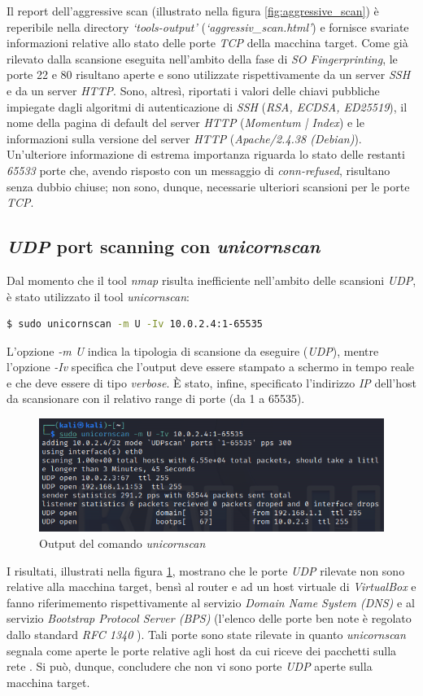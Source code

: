 Il report dell'aggressive scan (illustrato nella figura \ref{fig:aggressive_scan}) è reperibile nella directory \emph{`tools-output'}  (\emph{`aggressiv\_scan.html'}) e fornisce svariate informazioni relative allo stato delle porte \emph{TCP} della macchina target. Come già rilevato dalla scansione eseguita nell'ambito della fase di \emph{SO Fingerprinting}, le porte 22 e 80 risultano aperte e sono utilizzate rispettivamente da un server \emph{SSH} e da un server \emph{HTTP}. Sono, altresì, riportati i valori delle chiavi pubbliche impiegate dagli algoritmi di autenticazione di \emph{SSH} (\emph{RSA, ECDSA, ED25519}), il nome della pagina di default del server \emph{HTTP} (\emph{Momentum | Index}) e le informazioni sulla versione del server \emph{HTTP} (\emph{Apache/2.4.38 (Debian)}). Un'ulteriore informazione di estrema importanza riguarda lo stato delle restanti \emph{65533} porte che, avendo risposto con un messaggio di \emph{conn-refused}, risultano senza dubbio chiuse; non sono, dunque, necessarie ulteriori scansioni per le porte \emph{TCP}. 
\subsection{\emph{UDP} port scanning con \emph{unicornscan}}
Dal momento che il tool \emph{nmap} risulta inefficiente nell'ambito delle scansioni \emph{UDP}, è stato utilizzato il tool \emph{unicornscan}:
\begin{lstlisting}[language=bash]
    $ sudo unicornscan -m U -Iv 10.0.2.4:1-65535
\end{lstlisting}
L'opzione \emph{-m U} indica la tipologia di scansione da eseguire (\emph{UDP}), mentre l'opzione \emph{-Iv} specifica che l'output deve essere stampato a schermo in tempo reale e che deve essere di tipo \emph{verbose}. È stato, infine, specificato l'indirizzo \emph{IP} dell'host da scansionare con il relativo range di porte (da 1 a 65535).  
\begin{figure}[h]
    \centering
    \includegraphics[scale=0.7]{capitoli/images/udp.png}
    \caption{Output del comando \emph{unicornscan}}
    \label{fig:unicornscan}
\end{figure}
I risultati, illustrati nella figura \ref{fig:unicornscan}, mostrano che le porte \emph{UDP} rilevate non sono relative alla macchina target, bensì al router e ad un host virtuale di \emph{VirtualBox} e fanno riferimemento rispettivamente al servizio \emph{Domain Name System (DNS)} e al servizio \emph{Bootstrap Protocol Server (BPS)} (l'elenco delle porte ben note è regolato dallo standard \emph{RFC 1340} \cite{rfc1340}). Tali porte sono state rilevate in quanto \emph{unicornscan} segnala come aperte le porte relative agli host da cui riceve dei pacchetti sulla rete \cite{unicornscan}. Si può, dunque, concludere che non vi sono porte \emph{UDP} aperte sulla macchina target. 
